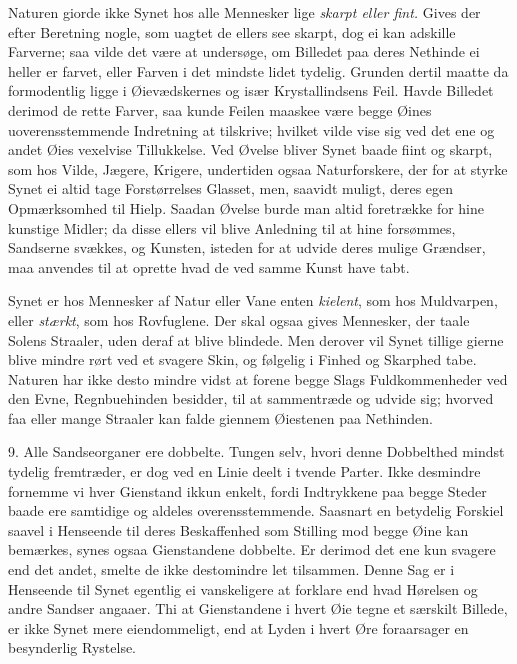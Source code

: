 \documentclass[12pt,a4paper]{article}
\newcommand{\opage}[1]{\marginnote{\footnotesize\textit{[#1]}}}
\begin{document}
Naturen giorde ikke Synet hos alle Mennesker lige \emph{skarpt eller fint.} Gives der
efter Beretning nogle, som uagtet de ellers see skarpt, dog ei kan adskille Farverne;
saa vilde det være at undersøge, om Billedet paa deres Nethinde ei heller er farvet,
eller Farven i det mindste lidet tydelig. Grunden dertil maatte da formodentlig ligge i
Øievædskernes og især Krystallindsens Feil. Havde Billedet derimod de rette Farver, saa
kunde Feilen maaskee være begge Øines uoverensstemmende Indretning at tilskrive;
hvilket vilde vise sig ved det ene og andet Øies vexelvise Tillukkelse. Ved Øvelse
bliver Synet baade fiint og skarpt, som hos Vilde, Jægere, Krigere, undertiden ogsaa
Naturforskere, der for at styrke Synet ei altid tage Forstørrelses Glasset, men,
saavidt muligt, deres egen Opmærksomhed til Hielp. Saadan Øvelse burde man altid
foretrække for hine kunstige Midler; da disse ellers vil blive Anledning til at hine
forsømmes, Sandserne svækkes, og Kunsten, isteden for at udvide deres mulige Grændser,
maa anvendes til at oprette hvad de ved samme Kunst have tabt.

Synet er hos Mennesker af Natur eller Vane enten \emph{kielent}, som hos Muldvarpen,
eller \emph{stærkt}, som hos Rovfuglene. Der skal ogsaa gives Mennesker, der taale
Solens Straaler, uden deraf at blive blindede.
\opage{74} Men derover vil Synet tillige gierne blive mindre rørt ved et svagere Skin, og følgelig
i Finhed og Skarphed tabe. Naturen har ikke desto mindre vidst at forene begge Slags
Fuldkommenheder ved den Evne, Regnbuehinden besidder, til at sammentræde og udvide
sig; hvorved faa eller mange Straaler kan falde giennem Øiestenen paa Nethinden.

9. Alle Sandseorganer ere dobbelte. Tungen selv, hvori denne Dobbelthed mindst tydelig
fremtræder, er dog ved en Linie deelt i tvende Parter. Ikke desmindre fornemme vi hver
Gienstand ikkun enkelt, fordi Indtrykkene paa begge Steder baade ere samtidige og
aldeles overensstemmende. Saasnart en betydelig Forskiel saavel i Henseende til deres
Beskaffenhed som Stilling mod begge Øine kan bemærkes, synes ogsaa Gienstandene
dobbelte. Er derimod det ene kun svagere end det andet, smelte de ikke destomindre let
tilsammen. Denne Sag er i Henseende til Synet egentlig ei vanskeligere at forklare end
hvad Hørelsen og andre Sandser angaaer. Thi at Gienstandene i hvert Øie tegne et
særskilt Billede, er ikke Synet mere eiendommeligt, end at Lyden i hvert Øre
foraarsager en besynderlig Rystelse.
\end{document}

